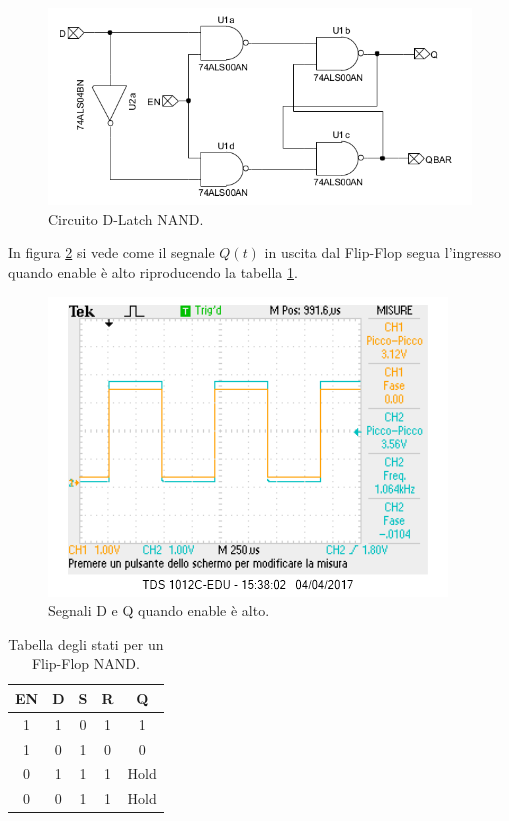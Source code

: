 \documentclass[10pt,a4paper]{article}
\begin{document}
\begin{figure}[!htb]
\centering
\includegraphics[scale=0.7]{flipflopDlatch.png}
\caption{Circuito D-Latch NAND.\label{circuito}}
\end{figure}

In figura \ref{segue} si vede come il segnale $Q(t)$ in uscita dal Flip-Flop segua l'ingresso quando enable è alto riproducendo la tabella \ref{stati2}.\\

\begin{figure}[!htb]
\centering
\includegraphics[scale=1.0]{FFD1in2Q.png}
\caption{Segnali D e Q quando enable è alto.\label{segue}}
\end{figure}

\begin{table}[!htb]
\centering
\begin{tabular}{|c|c|c|c|c|}
\hline 
EN & D & S & R & Q\\ 
\hline 
1 & 1 & 0 & 1 & 1\\ 
\hline 
1 & 0 & 1 & 0 & 0\\ 
\hline 
0 & 1 & 1 & 1 & Hold\\ 
\hline 
0 & 0 & 1 & 1 & Hold\\ 
\hline 
\end{tabular}
\caption{Tabella degli stati per un Flip-Flop NAND. \label{stati2}}
\end{table}
\end{document}
